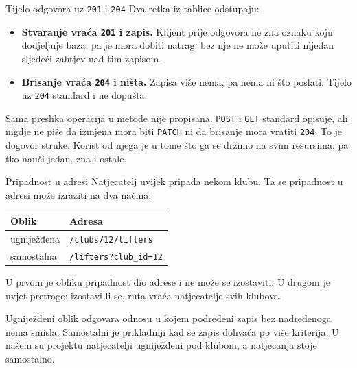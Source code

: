 \begin{frame}{Tijelo odgovora uz \texttt{201} i \texttt{204}}
Dva retka iz tablice odstupaju:

\vspace{0.9em}
\begin{itemize}
  \itemsep0.6em
  \item \textbf{Stvaranje vraća \texttt{201} i zapis.} Klijent prije odgovora ne zna oznaku koju dodjeljuje baza, pa je mora dobiti natrag; bez nje ne može uputiti nijedan sljedeći zahtjev nad tim zapisom.
  \item \textbf{Brisanje vraća \texttt{204} i ništa.} Zapisa više nema, pa nema ni što poslati. Tijelo uz \texttt{204} standard i ne dopušta.
\end{itemize}

\begin{konvencija}
Sama preslika operacija u metode nije propisana. \texttt{POST} i \texttt{GET} standard opisuje, ali nigdje ne piše da izmjena mora biti \texttt{PATCH} ni da brisanje mora vratiti \texttt{204}. To je dogovor struke. Korist od njega je u tome što ga se držimo na svim resursima, pa tko nauči jedan, zna i ostale.
\end{konvencija}
\end{frame}

\begin{frame}{Pripadnost u adresi}
Natjecatelj uvijek pripada nekom klubu. Ta se pripadnost u adresi može izraziti na dva načina:

\vspace{0.25em}
\begin{center}
{\small
\setlength{\tabcolsep}{8pt}
\renewcommand{\arraystretch}{1.05}
\begin{tabular}{@{}ll@{}}
  \toprule
  \textbf{Oblik} & \textbf{Adresa} \\
  \midrule
  ugniježđena & \texttt{/clubs/12/lifters} \\
  samostalna  & \texttt{/lifters?club\_id=12} \\
  \bottomrule
\end{tabular}
}
\end{center}

\vspace{0.3em}
U prvom je obliku pripadnost dio adrese i ne može se izostaviti. U drugom je uvjet pretrage: izostavi li se, ruta vraća natjecatelje svih klubova.
\begin{konvencija}
Ugniježđeni oblik odgovara odnosu u kojem podređeni zapis bez nadređenoga nema smisla. Samostalni je prikladniji kad se zapis dohvaća po više kriterija. U našem su projektu natjecatelji ugniježđeni pod klubom, a natjecanja stoje samostalno.
\end{konvencija}
\end{frame}

